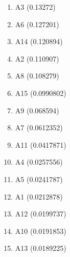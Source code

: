 \begin{enumerate}
\item A3 (0.13272)
\item A6 (0.127201)
\item A14 (0.120894)
\item A2 (0.110907)
\item A8 (0.108279)
\item A15 (0.0990802)
\item A9 (0.068594)
\item A7 (0.0612352)
\item A11 (0.0417871)
\item A4 (0.0257556)
\item A5 (0.0241787)
\item A1 (0.0212878)
\item A12 (0.0199737)
\item A10 (0.0191853)
\item A13 (0.0189225)
\end{enumerate}